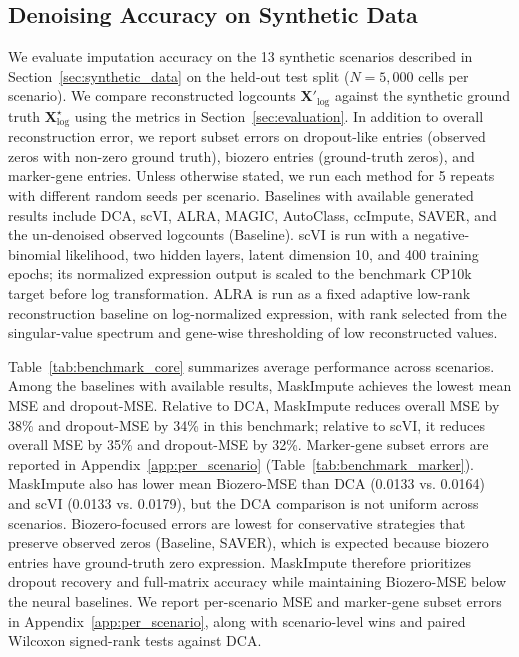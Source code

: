 \documentclass{article}
\theoremstyle{plain}
\theoremstyle{definition}
\theoremstyle{remark}
\begin{document}
\subsection{Denoising Accuracy on Synthetic Data}
\label{sec:denoising_results}
We evaluate imputation accuracy on the 13 synthetic scenarios described in
Section~\ref{sec:synthetic_data} on the held-out test split ($N=5{,}000$ cells
per scenario). We compare reconstructed logcounts $\mathbf{X}'_{\log}$ against
the synthetic ground truth $\mathbf{X}^{\star}_{\log}$ using the metrics in
Section~\ref{sec:evaluation}. In addition to overall reconstruction error, we
report subset errors on dropout-like entries (observed zeros with non-zero
ground truth), biozero entries (ground-truth zeros), and marker-gene entries.
Unless otherwise stated, we run each method for 5 repeats with different random
seeds per scenario. Baselines with available generated results include DCA,
scVI, ALRA, MAGIC, AutoClass, ccImpute, SAVER, and the un-denoised observed
logcounts (Baseline).
scVI is run with a negative-binomial likelihood, two hidden layers, latent
dimension 10, and 400 training epochs; its normalized expression output is
scaled to the benchmark CP10k target before log transformation. ALRA is run as a
fixed adaptive low-rank reconstruction baseline on log-normalized expression,
with rank selected from the singular-value spectrum and gene-wise thresholding
of low reconstructed values.

\begin{table}[t]
\caption{Synthetic test split benchmark summary across 13 scenarios and 5 seeds.
Entries report means across scenario-level estimates; $\pm$ values are standard
deviations across scenarios. Each scenario-level estimate averages 5 random
seeds. Baseline denotes the un-denoised observed logcounts (identity). Lower is
better.}
\label{tab:benchmark_core}
\centering
\footnotesize

\end{table}

Table~\ref{tab:benchmark_core} summarizes average performance across scenarios.
Among the baselines with available results, MaskImpute achieves the lowest mean
MSE and dropout-MSE. Relative to DCA, MaskImpute reduces overall MSE by 38\% and
dropout-MSE by 34\% in this benchmark; relative to scVI, it reduces overall MSE
by 35\% and dropout-MSE by 32\%. Marker-gene subset errors are reported in Appendix~\ref{app:per_scenario}
(Table~\ref{tab:benchmark_marker}).
MaskImpute also has lower mean Biozero-MSE than DCA (0.0133 vs. 0.0164) and
scVI (0.0133 vs. 0.0179), but the DCA comparison is not uniform across
scenarios. Biozero-focused errors are
lowest for conservative strategies that preserve observed zeros (Baseline,
SAVER), which is expected because biozero entries have ground-truth zero
expression. MaskImpute therefore prioritizes dropout recovery and full-matrix
accuracy while maintaining Biozero-MSE below the neural baselines.
We report per-scenario MSE and marker-gene subset errors in
Appendix~\ref{app:per_scenario}, along with scenario-level wins and paired
Wilcoxon signed-rank tests against DCA.
\end{document}
